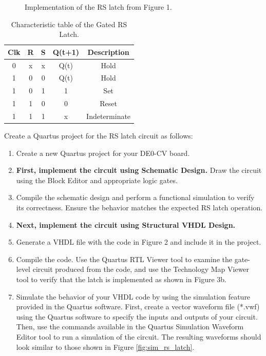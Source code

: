\documentclass{article}
\begin{document}
\begin{figure}[H]
    \centering
    
    \caption{Implementation of the RS latch from Figure 1.}
    \label{fig:rs_latch_impl}
\end{figure}


\begin{table}[H]
    \centering
    \begin{tabular}{|c|c|c|c|c|}
        \hline
        Clk & R & S & Q(t+1) & Description \\
        \hline
        0 & x & x & Q(t) & Hold \\
        1 & 0 & 0 & Q(t) & Hold \\
        1 & 0 & 1 & 1 & Set \\
        1 & 1 & 0 & 0 & Reset \\
        1 & 1 & 1 & x & Indeterminate \\
        \hline
    \end{tabular}
    \caption{Characteristic table of the Gated RS Latch.}
    \label{tab:rs_latch_char}
\end{table}

Create a Quartus project for the RS latch circuit as follows:
\begin{enumerate}
    \item Create a new Quartus project for your DE0-CV board.
    \item \textbf{First, implement the circuit using Schematic Design.} Draw the circuit using the Block Editor and appropriate logic gates.
    \item Compile the schematic design and perform a functional simulation to verify its correctness. Ensure the behavior matches the expected RS latch operation.
    \item \textbf{Next, implement the circuit using Structural VHDL Design.}
    \item Generate a VHDL file with the code in Figure 2 and include it in the project.
    \item Compile the code. Use the Quartus RTL Viewer tool to examine the gate-level circuit produced from the code, and use the Technology Map Viewer tool to verify that the latch is implemented as shown in Figure 3b.
    \item Simulate the behavior of your VHDL code by using the simulation feature provided in the Quartus software. First, create a vector waveform file (*.vwf) using the Quartus software to specify the inputs and outputs of your circuit. Then, use the commands available in the Quartus Simulation Waveform Editor tool to run a simulation of the circuit. The resulting waveforms should look similar to those shown in Figure \ref{fig:sim_rs_latch}.
\end{enumerate}
\end{document}
